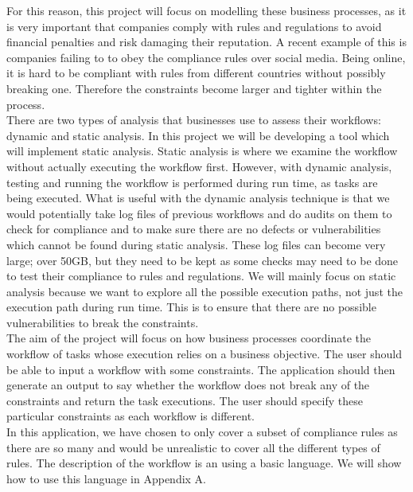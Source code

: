 \documentclass[a4paper]{report}
\begin{document}
For this reason, this project will focus on modelling these business processes, as it is very important that companies comply with rules and regulations to avoid financial penalties and risk damaging their reputation. A recent example of this is companies failing to to obey the compliance rules over social media\cite{Compliance}. Being online, it is hard to be compliant with rules from different countries without possibly breaking one. Therefore the constraints become larger and tighter within the process. \\   

There are two types of analysis that businesses use to assess their workflows: dynamic and static analysis\cite{analysis}. In this project we will be developing a tool which will implement static analysis. Static analysis is where we examine the workflow without actually executing the workflow first. However, with dynamic analysis, testing and running the workflow is performed during run time, as tasks are being executed. What is useful with the dynamic analysis  technique is that we would potentially take log files of previous workflows and do audits on them to check for compliance and to make sure there are no defects or vulnerabilities which cannot be found during static analysis. These log files can become very large; over 50GB, but they need to be kept as some checks may need to be done to test their compliance to rules and regulations. We will mainly focus on static analysis because we want to explore all the possible execution paths, not just the execution path during run time. This is to ensure that there are no possible vulnerabilities to break the constraints. \\

The aim of the project will focus on how business processes coordinate the workflow of tasks whose execution relies on a business objective. The user should be able to input a workflow with some constraints. The application should then generate an output to say whether the workflow does not break any of the constraints and return the task executions. The user should specify these particular constraints as each workflow is different. \\

In this application, we have chosen to only cover a subset of compliance rules as there are so many and would be unrealistic to cover all the different types of rules. The description of the workflow is an using a basic language. We will show how to use this language in Appendix A. 
\end{document}

